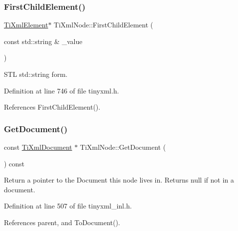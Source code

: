 \hypertarget{class_ti_xml_node_a7f1d7291880534c1e5cdeb392d8c1f45}{}\label{class_ti_xml_node_a7f1d7291880534c1e5cdeb392d8c1f45} 
\subsubsection{\texorpdfstring{First\+Child\+Element()}{FirstChildElement()}\hspace{0.1cm}{\footnotesize\ttfamily [6/6]}}
{\footnotesize\ttfamily \hyperlink{class_ti_xml_element}{Ti\+Xml\+Element}$\ast$ Ti\+Xml\+Node\+::\+First\+Child\+Element (\begin{DoxyParamCaption}\item[{const std\+::string \&}]{\+\_\+value }\end{DoxyParamCaption})\hspace{0.3cm}{\ttfamily [inline]}}



S\+TL std\+::string form. 



Definition at line 746 of file tinyxml.\+h.



References First\+Child\+Element().

\hypertarget{class_ti_xml_node_adcb070acefcbaedaa0673d82e530538b}{}\label{class_ti_xml_node_adcb070acefcbaedaa0673d82e530538b} 
\subsubsection{\texorpdfstring{Get\+Document()}{GetDocument()}\hspace{0.1cm}{\footnotesize\ttfamily [1/2]}}
{\footnotesize\ttfamily const \hyperlink{class_ti_xml_document}{Ti\+Xml\+Document} $\ast$ Ti\+Xml\+Node\+::\+Get\+Document (\begin{DoxyParamCaption}{ }\end{DoxyParamCaption}) const}

Return a pointer to the Document this node lives in. Returns null if not in a document. 

Definition at line 507 of file tinyxml\+\_\+inl.\+h.



References parent, and To\+Document().



